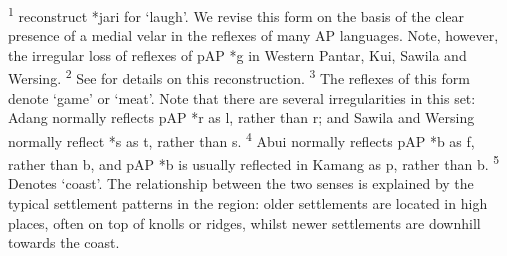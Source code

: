 \textsuperscript{1} \citet{HoltonEtAl2012} reconstruct *jari for `laugh'. We revise this form on the basis of the clear presence of a medial velar in the reflexes of many AP languages. Note, however, the irregular loss of reflexes of pAP *g in Western Pantar, Kui, Sawila and Wersing.  \textsuperscript{2} See \citet{SchapperTV} for details on this reconstruction.  \textsuperscript{3} The reflexes of this form denote `game' or `meat'. Note that there are several irregularities in this set: Adang normally reflects pAP *r as l, rather than r; and Sawila and Wersing normally reflect *s as t, rather than s.  \textsuperscript{4} Abui normally reflects pAP *b as f, rather than b, and pAP *b is usually reflected in Kamang as p, rather than b.  \textsuperscript{5} Denotes `coast'. The relationship between the two senses is explained by the typical settlement patterns in the region: older settlements are located in high places, often on top of knolls or ridges, whilst newer settlements are downhill towards the coast.




